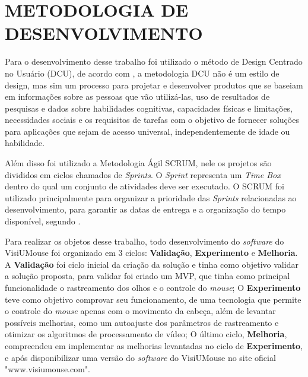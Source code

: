 \section{METODOLOGIA DE DESENVOLVIMENTO}\label{Sub:metodologia-desenvolvimento}
Para o desenvolvimento desse trabalho foi utilizado o método de Design Centrado no Usuário (DCU), de acordo com \cite{GREENHOUSE2010}, a metodologia DCU não é um estilo de design, mas sim um processo para projetar e desenvolver produtos que se baseiam em informações sobre as pessoas que vão utilizá-las, uso de resultados de pesquisas e dados sobre habilidades cognitivas, capacidades físicas e limitações, necessidades sociais e os requisitos de tarefas com o objetivo de fornecer soluções para aplicações que sejam de acesso universal, independentemente de idade ou habilidade. 

Além disso foi utilizado a Metodologia Ágil SCRUM, nele os projetos são divididos em ciclos chamados de \textit{Sprints}. O \textit{Sprint} representa um \textit{Time Box} dentro do qual um conjunto de atividades deve ser executado. O SCRUM foi utilizado principalmente para organizar a prioridade das \textit{Sprints} relacionadas ao desenvolvimento, para garantir as datas de entrega e a organização do tempo disponível, segundo .

Para realizar os objetos desse trabalho, todo desenvolvimento do \textit{software} do VisiUMouse foi organizado em 3 ciclos: \textbf{Validação}, \textbf{Experimento} e \textbf{Melhoria}. A \textbf{Validação} foi ciclo inicial da criação da solução e tinha como objetivo validar a solução proposta, para validar foi criado um MVP, que tinha como principal funcionalidade o rastreamento dos olhos e o controle do \textit{mouse}; O \textbf{Experimento} teve como objetivo comprovar seu funcionamento, de uma tecnologia que permite o controle do \textit{mouse} apenas com o movimento da cabeça, além de levantar possíveis melhorias, como um autoajuste dos parâmetros de rastreamento e otimizar os algoritmos de processamento de vídeo; O último ciclo, \textbf{Melhoria},  compreendeu em implementar as melhorias levantadas no ciclo de \textbf{Experimento}, e após disponibilizar uma versão do \textit{software} do VisiUMouse no site oficial "www.visiumouse.com".

